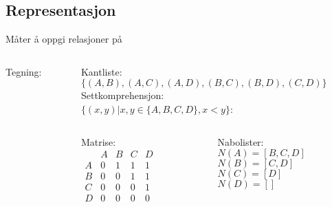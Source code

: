 \subsection*{Representasjon}
\begin{frame}[fragile]{Måter å oppgi relasjoner på}
    \begin{columns}
        \begin{column}{0.3\textwidth}
            Tegning:

        \end{column}
        \begin{column}{0.65\textwidth}
            Kantliste:\\
            $\{(A, B), (A, C), (A, D), (B, C), (B, D), (C, D)\}$\\[5mm]
            Settkomprehensjon:\\
            $\{(x, y) | x, y \in \{A,B,C,D\}, x < y\}$:\\[5mm]
            \begin{columns}
                \begin{column}{0.27\textwidth}
                    Matrise:\\
                    \begin{math}
                        \begin{matrix}
                              & A & B & C & D\\
                            A & 0 & 1 & 1 & 1\\
                            B & 0 & 0 & 1 & 1\\
                            C & 0 & 0 & 0 & 1\\
                            D & 0 & 0 & 0 & 0
                        \end{matrix}
                    \end{math}
                \end{column}
                \begin{column}{0.38\textwidth}
                    Nabolister:\\        
                    $N(A) = [B, C, D]$\\
                    $N(B) = [C, D]$\\
                    $N(C) = [D]$\\
                    $N(D) = []$
                \end{column} 
            \end{columns}
        \end{column}
    \end{columns}
\end{frame}


